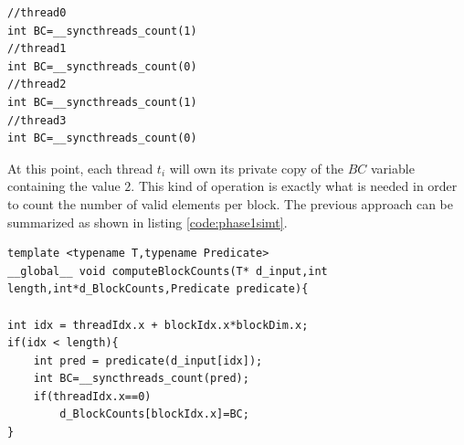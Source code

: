 \begin{lstlisting}
//thread0
int BC=__syncthreads_count(1)
//thread1
int BC=__syncthreads_count(0)
//thread2
int BC=__syncthreads_count(1)
//thread3
int BC=__syncthreads_count(0)
\end{lstlisting}
At this point, each thread \(t_i\) will own its private copy of the \(BC\) variable containing the value $2$.
This kind of operation is exactly what is needed in order to count the number of valid elements per block.
The previous approach can be summarized as shown in listing \ref{code:phase1simt}.
\begin{lstlisting}
template <typename T,typename Predicate>
__global__ void computeBlockCounts(T* d_input,int length,int*d_BlockCounts,Predicate predicate){

int idx = threadIdx.x + blockIdx.x*blockDim.x;
if(idx < length){
	int pred = predicate(d_input[idx]);
	int BC=__syncthreads_count(pred);
	if(threadIdx.x==0)
		d_BlockCounts[blockIdx.x]=BC;
}
\end{lstlisting}

